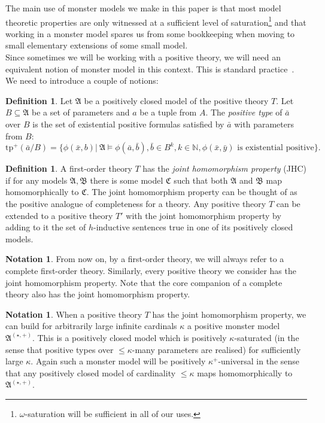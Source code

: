 \documentclass{amsart}
\theoremstyle{definition}
\newtheorem{definition}[theorem]{Definition}
\newtheorem{notation}[theorem]{Notation}
\theoremstyle{remark}
\numberwithin{equation}{section}
\newcommand{\fa}{\mathfrak{A}}
\newcommand{\fb}{\mathfrak{B}}
\newcommand{\fc}{\mathfrak{C}}
\begin{document}
The main use of monster models we  make in this paper is that most model theoretic properties are only witnessed at a sufficient level of saturation\footnote{$\omega$-saturation will be sufficient in all of our uses.} and that working in a monster model spares us from some bookkeeping when moving to small elementary extensions of some small model.\\


Since sometimes we will be working with a positive theory, we will need an equivalent notion of monster model in this context. This is standard practice~\cite{ben2003positive, PosModT}. We need to introduce a couple of notions:

\begin{definition} Let $\fa$ be a positively closed model of the positive theory $T$. Let $B\subseteq \fa$ be a set of parameters and $a$ be a tuple from $A$. The \textit{positive type} of $\bar{a}$ over $B$ is the set of existential positive formulas satisfied by $\bar{a}$ with parameters from $B$:
\[\mathrm{tp}^+(\bar{a}/B)=\{\phi(\bar{x},b)\vert \  \fa\vDash \phi(\bar{a},\bar{b}), \bar{b}\in B^k, k\in\mathbb{N}, \phi(\bar{x},\bar{y}) \text{ is existential positive}\}.\]
\end{definition}


\begin{definition} A first-order theory $T$ has the \textit{joint homomorphism property} (JHC) if for any models $\fa, \fb$ there is some model $\fc$ such that both $\fa$ and $\fb$ map homomorphically to $\fc$. The joint homomorphism property can be thought of as the positive analogue of completeness for a theory. Any positive theory $T$ can be extended to a positive theory $T'$ with the joint homomorphism property by adding to it the set of $h$-inductive sentences true in one of its positively closed models. 
\end{definition}

\begin{notation} From now on, by a first-order theory, we will always refer to a complete first-order theory. Similarly, every positive theory we consider has the joint homomorphism property. Note that the core companion  of a complete theory also has the joint homomorphism property. 
\end{notation}

\begin{notation} When a positive theory $T$ has the joint homomorphism property, we can build for arbitrarily large infinite cardinals $\kappa$ a positive monster model $\fa^{(\star, +)}$. This is a positively closed model which is positively $\kappa$-saturated (in the sense that positive types over $\leq\kappa$-many parameters are realised) for sufficiently large $\kappa$. 
Again such a monster model will be positively $\kappa^+$-universal in the sense that any positively closed model of cardinality $\leq \kappa$ maps homomorphically to $\fa^{(\star, +)}$. 
\end{notation}
\end{document}
